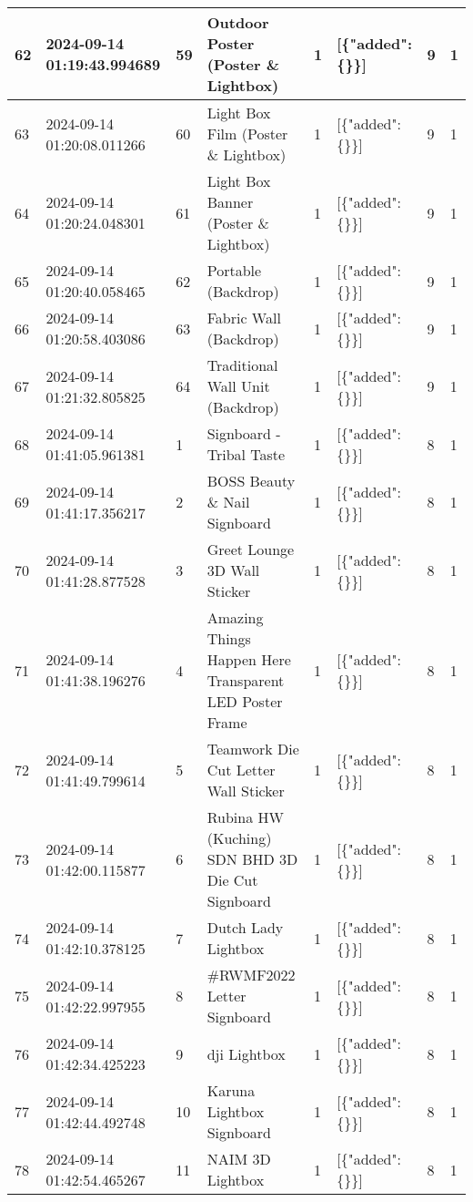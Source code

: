 \begin{longtable}{|l|l|l|l|l|l|l|l|}
62 & 2024-09-14 01:19:43.994689 & 59 & Outdoor Poster (Poster \& Lightbox) & 1 & [\{"added": \{\}\}] & 9 & 1 \\ \hline 
63 & 2024-09-14 01:20:08.011266 & 60 & Light Box Film (Poster \& Lightbox) & 1 & [\{"added": \{\}\}] & 9 & 1 \\ \hline 
64 & 2024-09-14 01:20:24.048301 & 61 & Light Box Banner (Poster \& Lightbox) & 1 & [\{"added": \{\}\}] & 9 & 1 \\ \hline 
65 & 2024-09-14 01:20:40.058465 & 62 & Portable (Backdrop) & 1 & [\{"added": \{\}\}] & 9 & 1 \\ \hline 
66 & 2024-09-14 01:20:58.403086 & 63 & Fabric Wall (Backdrop) & 1 & [\{"added": \{\}\}] & 9 & 1 \\ \hline 
67 & 2024-09-14 01:21:32.805825 & 64 & Traditional Wall Unit (Backdrop) & 1 & [\{"added": \{\}\}] & 9 & 1 \\ \hline 
68 & 2024-09-14 01:41:05.961381 & 1 & Signboard - Tribal Taste & 1 & [\{"added": \{\}\}] & 8 & 1 \\ \hline 
69 & 2024-09-14 01:41:17.356217 & 2 & BOSS Beauty \& Nail Signboard & 1 & [\{"added": \{\}\}] & 8 & 1 \\ \hline 
70 & 2024-09-14 01:41:28.877528 & 3 & Greet Lounge 3D Wall Sticker & 1 & [\{"added": \{\}\}] & 8 & 1 \\ \hline 
71 & 2024-09-14 01:41:38.196276 & 4 & Amazing Things Happen Here Transparent LED Poster Frame & 1 & [\{"added": \{\}\}] & 8 & 1 \\ \hline 
72 & 2024-09-14 01:41:49.799614 & 5 & Teamwork Die Cut Letter Wall Sticker & 1 & [\{"added": \{\}\}] & 8 & 1 \\ \hline 
73 & 2024-09-14 01:42:00.115877 & 6 & Rubina HW (Kuching) SDN BHD 3D Die Cut Signboard & 1 & [\{"added": \{\}\}] & 8 & 1 \\ \hline 
74 & 2024-09-14 01:42:10.378125 & 7 & Dutch Lady Lightbox & 1 & [\{"added": \{\}\}] & 8 & 1 \\ \hline 
75 & 2024-09-14 01:42:22.997955 & 8 & \#RWMF2022 Letter Signboard & 1 & [\{"added": \{\}\}] & 8 & 1 \\ \hline 
76 & 2024-09-14 01:42:34.425223 & 9 & dji Lightbox & 1 & [\{"added": \{\}\}] & 8 & 1 \\ \hline 
77 & 2024-09-14 01:42:44.492748 & 10 & Karuna Lightbox Signboard & 1 & [\{"added": \{\}\}] & 8 & 1 \\ \hline 
78 & 2024-09-14 01:42:54.465267 & 11 & NAIM 3D Lightbox & 1 & [\{"added": \{\}\}] & 8 & 1 \\ \hline 

\end{longtable}
